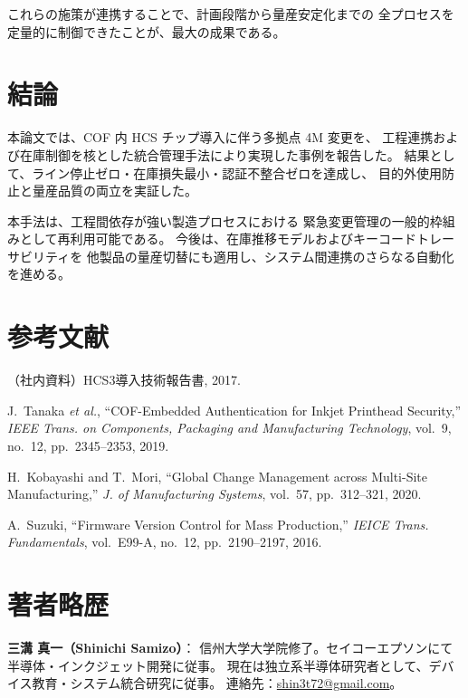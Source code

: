 \documentclass[journal,twocolumn]{IEEEtran}
\begin{document}
これらの施策が連携することで、計画段階から量産安定化までの
全プロセスを定量的に制御できたことが、最大の成果である。

\section{結論}

本論文では、COF 内 HCS チップ導入に伴う多拠点 4M 変更を、
工程連携および在庫制御を核とした統合管理手法により実現した事例を報告した。
結果として、ライン停止ゼロ・在庫損失最小・認証不整合ゼロを達成し、
目的外使用防止と量産品質の両立を実証した。

本手法は、工程間依存が強い製造プロセスにおける
緊急変更管理の一般的枠組みとして再利用可能である。
今後は、在庫推移モデルおよびキーコードトレーサビリティを
他製品の量産切替にも適用し、システム間連携のさらなる自動化を進める。

\section*{参考文献}
\begin{thebibliography}{99}
（社内資料）HCS3導入技術報告書, 2017.

J.~Tanaka \emph{et al.}, ``COF-Embedded Authentication for Inkjet Printhead Security,''
\emph{IEEE Trans. on Components, Packaging and Manufacturing Technology},
vol.~9, no.~12, pp.~2345--2353, 2019.

H.~Kobayashi and T.~Mori, ``Global Change Management across Multi-Site Manufacturing,''
\emph{J. of Manufacturing Systems}, vol.~57, pp.~312--321, 2020.

A.~Suzuki, ``Firmware Version Control for Mass Production,''
\emph{IEICE Trans. Fundamentals}, vol.~E99-A, no.~12, pp.~2190--2197, 2016.
\end{thebibliography}

\section*{著者略歴}
\noindent\textbf{三溝 真一（Shinichi Samizo）}：
信州大学大学院修了。セイコーエプソンにて半導体・インクジェット開発に従事。
現在は独立系半導体研究者として、デバイス教育・システム統合研究に従事。
連絡先：\href{mailto:shin3t72@gmail.com}{shin3t72@gmail.com}。
\end{document}
